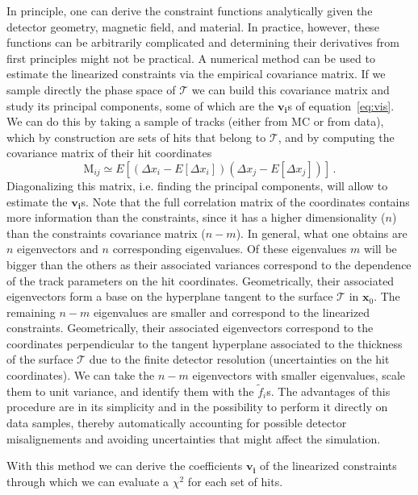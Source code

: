 \documentclass[10pt,a4paper]{report}
\newcommand{\bfx}{\mathbf{x}}
\begin{document}
In principle, one can derive the constraint functions analytically given the detector geometry, magnetic field, and material. In practice, however, these functions can be arbitrarily complicated and determining their derivatives from first principles might not be practical. A numerical method can be used to estimate the linearized constraints via the empirical covariance matrix. If we sample directly the phase space of $\mathcal{T}$ we can build this covariance matrix and study its principal components, some of which are the $\mathbf{v_i}$s of equation~\ref{eq:vis}. We can do this by taking a sample of tracks (either from MC or from data), which by construction are sets of hits that belong to $\mathcal{T}$, and by computing the covariance matrix of their hit coordinates
\begin{equation}
\mbox{M}_{ij} \simeq E[ (\Delta x_i - E[\Delta x_i])(\Delta x_j - E[\Delta x_j])]\, .
\end{equation}
Diagonalizing this matrix, i.e. finding the principal components, will allow to estimate the $\mathbf{v_i}$s. Note that the full correlation matrix of the coordinates contains more information than the constraints, since it has a higher dimensionality ($n$) than the constraints covariance matrix ($n - m$). In general, what one obtains are $n$ eigenvectors and $n$ corresponding eigenvalues. Of these eigenvalues $m$ will be bigger than the others as their associated variances correspond to the dependence of the track parameters on the hit coordinates. Geometrically, their associated eigenvectors form a base on the hyperplane tangent to the surface $\mathcal{T}$ in $\bfx_0$. The remaining $n - m$ eigenvalues are smaller and correspond to the linearized constraints. Geometrically, their associated eigenvectors correspond to the coordinates perpendicular to the tangent hyperplane associated to the thickness of the surface $\mathcal{T}$ due to the finite detector resolution (uncertainties on the hit coordinates). We can take the $n - m$ eigenvectors with smaller eigenvalues, scale them to unit variance, and identify them with the $\tilde{f}_i$s. The advantages of this procedure are in its simplicity and in the possibility to perform it directly on data samples, thereby automatically accounting for possible detector misalignements and avoiding uncertainties that might affect the simulation.

With this method we can derive the coefficients $\mathbf{v_i}$ of the linearized constraints through which we can evaluate a $\chi^2$ for each set of hits.
\end{document}
